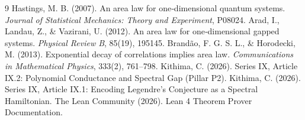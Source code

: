 \documentclass[11pt,a4paper]{article}
\begin{document}

\begin{thebibliography}{9}
  Hastings, M. B. (2007). An area law for one‑dimensional quantum systems. \emph{Journal of Statistical Mechanics: Theory and Experiment}, P08024.
  Arad, I., Landau, Z., \& Vazirani, U. (2012). An area law for one‑dimensional gapped systems. \emph{Physical Review B}, 85(19), 195145.
  Brandão, F. G. S. L., \& Horodecki, M. (2013). Exponential decay of correlations implies area law. \emph{Communications in Mathematical Physics}, 333(2), 761–798.
  Kithima, C. (2026). Series IX, Article IX.2: Polynomial Conductance and Spectral Gap (Pillar P2).
  Kithima, C. (2026). Series IX, Article IX.1: Encoding Legendre's Conjecture as a Spectral Hamiltonian.
  The Lean Community (2026). Lean 4 Theorem Prover Documentation.
\end{thebibliography}
\end{document}
